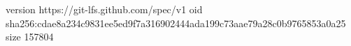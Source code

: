 version https://git-lfs.github.com/spec/v1
oid sha256:cdae8a234c9831ee5ed9f7a316902444ada199c73aae79a28c0b9765853a0a25
size 157804
